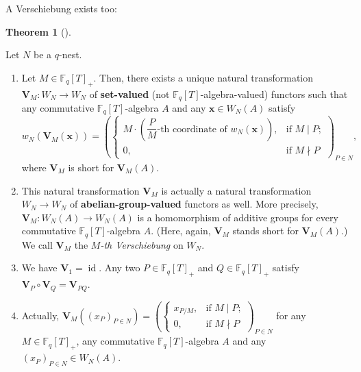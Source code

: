 \documentclass[numbers=enddot,12pt,final,onecolumn,notitlepage]{scrartcl}%
\theoremstyle{definition}
\newtheorem{theo}{Theorem}[section]
\newenvironment{theorem}[1][]
{\begin{theo}[#1]\begin{leftbar}}
{\end{leftbar}\end{theo}}
\begin{document}
A Verschiebung exists too:

\begin{theorem}
\label{thm.carlitz.Witt.ver}Let $N$ be a $q$-nest.

\begin{enumerate}
\item[\textbf{(a)}] Let $M\in\mathbb{F}_{q}\left[  T\right]  _{+}$. Then,
there exists a unique natural transformation $\mathbf{V}_{M}:W_{N}\rightarrow
W_{N}$ of \textbf{set-valued} (not $\mathbb{F}_{q}\left[  T\right]
$-algebra-valued) functors such that any commutative $\mathbb{F}_{q}\left[
T\right]  $-algebra $A$ and any $\mathbf{x}\in W_{N}\left(  A\right)  $
satisfy%
\[
w_{N}\left(  \mathbf{V}_{M}\left(  \mathbf{x}\right)  \right)  =\left(
\begin{cases}
M\cdot\left(  \dfrac{P}{M}\text{-th coordinate of }w_{N}\left(  \mathbf{x}%
\right)  \right)  , & \text{if }M\mid P;\\
0, & \text{if }M\nmid P
\end{cases}
\right)  _{P\in N},
\]
where $\mathbf{V}_{M}$ is short for $\mathbf{V}_{M}\left(  A\right)  $.

\item[\textbf{(b)}] This natural transformation $\mathbf{V}_{M}$ is actually a
natural transformation $W_{N}\rightarrow W_{N}$ of
\textbf{abelian-group-valued} functors as well. More precisely, $\mathbf{V}%
_{M}:W_{N}\left(  A\right)  \rightarrow W_{N}\left(  A\right)  $ is a
homomorphism of additive groups for every commutative $\mathbb{F}_{q}\left[
T\right]  $-algebra $A$. (Here, again, $\mathbf{V}_{M}$ stands short for
$\mathbf{V}_{M}\left(  A\right)  $.) We call $\mathbf{V}_{M}$ the
$M$\textit{-th Verschiebung} on $W_{N}$.

\item[\textbf{(c)}] We have $\mathbf{V}_{1}=\operatorname*{id}$. Any two
$P\in\mathbb{F}_{q}\left[  T\right]  _{+}$ and $Q\in\mathbb{F}_{q}\left[
T\right]  _{+}$ satisfy $\mathbf{V}_{P}\circ\mathbf{V}_{Q}=\mathbf{V}_{PQ}$.

\item[\textbf{(d)}] Actually, $\mathbf{V}_{M}\left(  \left(  x_{P}\right)
_{P\in N}\right)  =\left(
\begin{cases}
x_{P/M}, & \text{if }M\mid P;\\
0, & \text{if }M\nmid P
\end{cases}
\right)  _{P\in N}$ for any $M\in\mathbb{F}_{q}\left[  T\right]  _{+}$, any
commutative $\mathbb{F}_{q}\left[  T\right]  $-algebra $A$ and any $\left(
x_{P}\right)  _{P\in N}\in W_{N}\left(  A\right)  $.
\end{enumerate}
\end{theorem}
\end{document}
